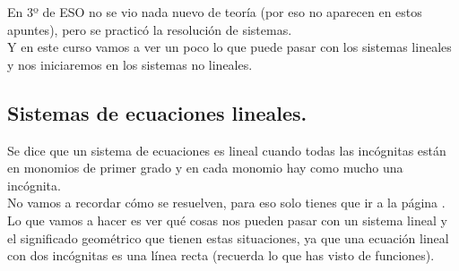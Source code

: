 \documentclass[a4paper,11pt,answers]{exam}
\begin{document}
En 3º de ESO no se vio nada nuevo de teoría (por eso no aparecen en estos apuntes), pero se
practicó la resolución de sistemas.\\

Y en este curso vamos a ver un poco lo que puede pasar con los sistemas lineales y nos iniciaremos
en los sistemas no lineales.

\subsection{Sistemas de ecuaciones lineales.}
Se dice que un sistema de ecuaciones es lineal cuando todas las incógnitas están en monomios de
primer grado y en cada monomio hay como mucho una incógnita.\\
No vamos a recordar cómo se resuelven, para eso solo tienes que ir a la página \pageref{sistemasI}.\\

Lo que vamos a hacer es ver qué cosas nos pueden pasar con un sistema lineal y el significado
geométrico que tienen estas situaciones, ya que una ecuación lineal con dos incógnitas es
una línea recta (recuerda lo que has visto de funciones).
\end{document}

